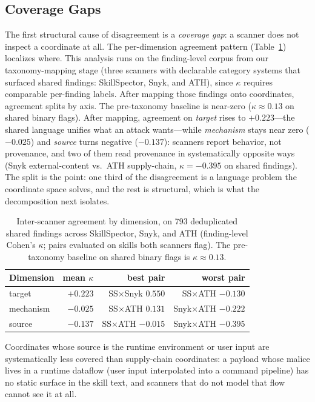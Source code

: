\documentclass[sigconf,nonacm]{acmart}
\begin{document}
\subsection{Coverage Gaps}
The first structural cause of disagreement is a \emph{coverage gap}: a scanner does not inspect a coordinate at all. The per-dimension agreement pattern (Table~\ref{tab:kappa}) localizes where. This analysis runs on the finding-level corpus from our taxonomy-mapping stage (three scanners with declarable category systems that surfaced shared findings: SkillSpector, Snyk, and ATH), since $\kappa$ requires comparable per-finding labels. After mapping those findings onto coordinates, agreement splits by axis. The pre-taxonomy baseline is near-zero ($\kappa\approx0.13$ on shared binary flags). After mapping, agreement on \emph{target} rises to $+0.223$---the shared language unifies what an attack wants---while \emph{mechanism} stays near zero ($-0.025$) and \emph{source} turns negative ($-0.137$): scanners report behavior, not provenance, and two of them read provenance in systematically opposite ways (Snyk external-content vs.\ ATH supply-chain, $\kappa=-0.395$ on shared findings). The split is the point: one third of the disagreement is a language problem the coordinate space solves, and the rest is structural, which is what the decomposition next isolates.

\begin{table}[t]
\caption{Inter-scanner agreement by dimension, on 793 deduplicated shared findings across SkillSpector, Snyk, and ATH (finding-level Cohen's $\kappa$; pairs evaluated on skills both scanners flag). The pre-taxonomy baseline on shared binary flags is $\kappa\approx0.13$.}
\label{tab:kappa}
\small
\begin{tabular}{@{}lrrr@{}}
\toprule
Dimension & mean $\kappa$ & best pair & worst pair \\
\midrule
target & $+0.223$ & SS$\times$Snyk $0.550$ & SS$\times$ATH $-0.130$ \\
mechanism & $-0.025$ & SS$\times$ATH $0.131$ & Snyk$\times$ATH $-0.222$ \\
source & $-0.137$ & SS$\times$ATH $-0.015$ & Snyk$\times$ATH $-0.395$ \\
\bottomrule
\end{tabular}
\end{table} Coordinates whose source is the runtime environment or user input are systematically less covered than supply-chain coordinates: a payload whose malice lives in a runtime dataflow (user input interpolated into a command pipeline) has no static surface in the skill text, and scanners that do not model that flow cannot see it at all.
\end{document}
